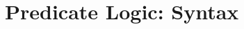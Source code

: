 \documentclass[../logic-text.tex]{subfiles}
\begin{document}
\chapter{Predicate Logic: Syntax}
\label{cha:pl-syntax}
\end{document}
